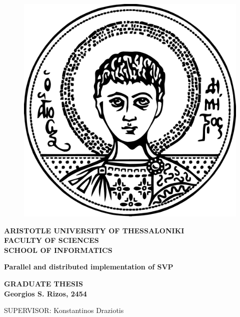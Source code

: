 \newpage
\mbox{}
\newpage

\begin{figure}[h] %
\vspace*{-1cm}
\centering
\includegraphics[scale=0.35]{pictures/AUThLogo.png}
\end{figure}

\begin{center}
 { \large \bf \lt ARISTOTLE UNIVERSITY OF THESSALONIKI
  \\ FACULTY OF SCIENCES
   \\SCHOOL OF INFORMATICS
    \\}
\vspace{2cm}

{\large \bf \lt Parallel and distributed implementation of SVP}
    
\vspace{2.5cm}

{\large \bf \lt GRADUATE THESIS
\\ Georgios S. Rizos, 2454
  \\}
  
  \vspace{2cm}
  
  {\lt SUPERVISOR: Konstantinos Draziotis}
\end{center}
